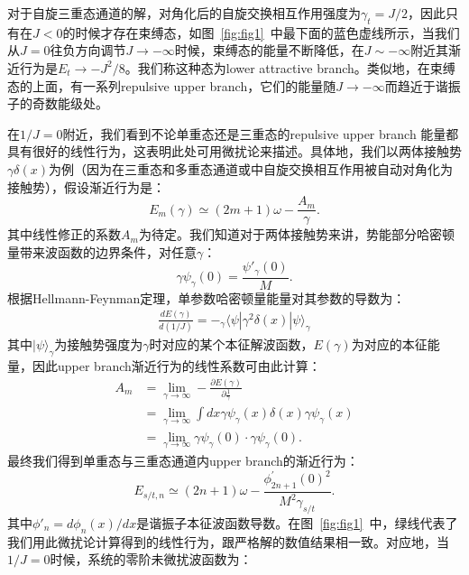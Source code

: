 对于自旋三重态通道的解，对角化后的自旋交换相互作用强度为$\gamma_t=J/2$，因此只有在$J<0$的时候才存在束缚态，如图~\ref{fig:fig1}~中最下面的蓝色虚线所示，当我们从$J=0$往负方向调节$J\to-\infty$时候，束缚态的能量不断降低，在$J\sim -\infty$附近其渐近行为是$E_t\rightarrow -J^2/8$。我们称这种态为lower attractive branch。类似地，在束缚态的上面，有一系列repulsive upper branch，它们的能量随$J\to-\infty$而趋近于谐振子的奇数能级处。

在$1/J=0$附近，我们看到不论单重态还是三重态的repulsive upper branch 能量都具有很好的线性行为，这表明此处可用微扰论来描述。具体地，我们以两体接触势$\gamma\delta(x)$为例（因为在三重态和多重态通道或中自旋交换相互作用被自动对角化为接触势），假设渐近行为是：
\begin{equation}
    E_m(\gamma) \simeq  (2m+1)\omega - \frac{A_m}{\gamma}.
\end{equation}
其中线性修正的系数$A_m$为待定。我们知道对于两体接触势来讲，势能部分哈密顿量带来波函数的边界条件，对任意$\gamma$：
\begin{equation}
    \gamma\psi_\gamma(0) = \frac{\psi'_\gamma(0)}{M}.
\end{equation}
根据Hellmann-Feynman定理，单参数哈密顿量能量对其参数的导数为：
\begin{equation}
\begin{split}
    \frac{dE(\gamma)}{d(1/J)} = -{}_\gamma\langle\psi| \gamma^2\delta(x) |\psi\rangle_\gamma
\end{split}
\end{equation}
其中$|\psi\rangle_\gamma$为接触势强度为$\gamma$时对应的某个本征解波函数，$E(\gamma)$为对应的本征能量，因此upper branch渐近行为的线性系数可由此计算：
\begin{equation}
\begin{split}
    A_m &= \lim_{\gamma\to \infty} -\frac{\partial E(\gamma)}{\partial \frac{1}{\gamma} }\\
    \quad &= \lim_{\gamma\to \infty} \int dx \gamma\psi_\gamma(x)\delta(x)\gamma\psi_\gamma(x) \\
    \quad &= \lim_{\gamma\to \infty} \gamma\psi_\gamma(0)\cdot \gamma\psi_\gamma(0). 
\end{split}
\end{equation}
最终我们得到单重态与三重态通道内upper branch的渐近行为：
\begin{equation}
E_{s/t,n} \simeq (2n+1)\omega -\frac{\phi^{'}_{2n+1}(0)^2}{M^2\gamma_{s/t}}. \label{asymptotic}
\end{equation}
其中$\phi'_n=d\phi_n(x)/dx$是谐振子本征波函数导数。在图~\ref{fig:fig1}~中，绿线代表了我们用此微扰论计算得到的线性行为，跟严格解的数值结果相一致。对应地，当$1/J=0$时候，系统的零阶未微扰波函数为\cite{zurn2012fermionization}：
